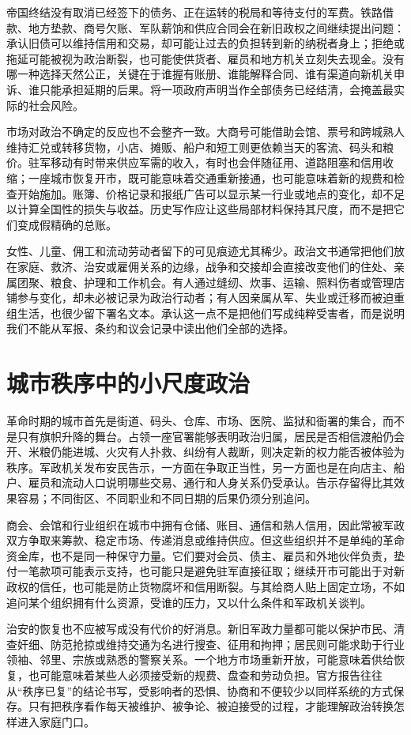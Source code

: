 帝国终结没有取消已经签下的债务、正在运转的税局和等待支付的军费。铁路借款、地方垫款、商号欠账、军队薪饷和供应合同会在新旧政权之间继续提出问题：承认旧债可以维持信用和交易，却可能让过去的负担转到新的纳税者身上；拒绝或拖延可能被视为政治断裂，也可能使供货者、雇员和地方机关立刻失去现金。没有哪一种选择天然公正，关键在于谁握有账册、谁能解释合同、谁有渠道向新机关申诉、谁只能承担延期的后果。将一项政府声明当作全部债务已经结清，会掩盖最实际的社会风险。

市场对政治不确定的反应也不会整齐一致。大商号可能借助会馆、票号和跨城熟人维持汇兑或转移货物，小店、摊贩、船户和短工则更依赖当天的客流、码头和粮价。驻军移动有时带来供应军需的收入，有时也会伴随征用、道路阻塞和信用收缩；一座城市恢复开市，既可能意味着交通重新接通，也可能意味着新的规费和检查开始施加。账簿、价格记录和报纸广告可以显示某一行业或地点的变化，却不足以计算全国性的损失与收益。历史写作应让这些局部材料保持其尺度，而不是把它们变成假精确的总账。

女性、儿童、佣工和流动劳动者留下的可见痕迹尤其稀少。政治文书通常把他们放在家庭、救济、治安或雇佣关系的边缘，战争和交接却会直接改变他们的住处、亲属团聚、粮食、护理和工作机会。有人通过缝纫、炊事、运输、照料伤者或管理店铺参与变化，却未必被记录为政治行动者；有人因亲属从军、失业或迁移而被迫重组生活，也很少留下署名文本。承认这一点不是把他们写成纯粹受害者，而是说明我们不能从军报、条约和议会记录中读出他们全部的选择。

\section{城市秩序中的小尺度政治}

革命时期的城市首先是街道、码头、仓库、市场、医院、监狱和衙署的集合，而不是只有旗帜升降的舞台。占领一座官署能够表明政治归属，居民是否相信渡船仍会开、米粮仍能进城、火灾有人扑救、纠纷有人裁断，则决定新的权力能否被体验为秩序。军政机关发布安民告示，一方面在争取正当性，另一方面也是在向店主、船户、雇员和流动人口说明哪些交易、通行和人身关系仍受承认。告示存留得比其效果容易；不同街区、不同职业和不同日期的后果仍须分别追问。

商会、会馆和行业组织在城市中拥有仓储、账目、通信和熟人信用，因此常被军政双方争取来筹款、稳定市场、传递消息或维持供应。但这些组织并不是单纯的革命资金库，也不是同一种保守力量。它们要对会员、债主、雇员和外地伙伴负责，垫付一笔款项可能表示支持，也可能只是避免驻军直接征取；继续开市可能出于对新政权的信任，也可能是防止货物腐坏和信用断裂。与其给商人贴上固定立场，不如追问某个组织拥有什么资源，受谁的压力，又以什么条件和军政机关谈判。

治安的恢复也不应被写成没有代价的好消息。新旧军政力量都可能以保护市民、清查奸细、防范抢掠或维持交通为名进行搜查、征用和拘押；居民则可能求助于行业领袖、邻里、宗族或熟悉的警察关系。一个地方市场重新开放，可能意味着供给恢复，也可能意味着某些人必须接受新的规费、盘查和劳动负担。官方报告往往从“秩序已复”的结论书写，受影响者的恐惧、协商和不便较少以同样系统的方式保存。只有把秩序看作每天被维护、被争论、被迫接受的过程，才能理解政治转换怎样进入家庭门口。

